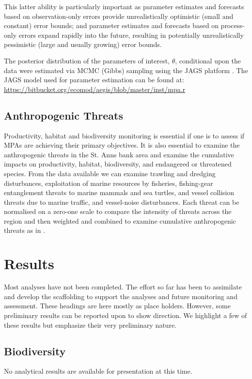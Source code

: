 \documentclass[letterpaper,portrait,11pt]{scrartcl}
\numberwithin{equation}{section}    %
\numberwithin{figure}{section}    %
\numberwithin{table}{section}       %
\begin{document}
This latter ability is particularly important as parameter estimates and forecasts based on observation-only errors provide unrealistically optimistic (small and constant) error bounds; and parameter estimates and forecasts based on process-only errors expand rapidly into the future, resulting in potentially unrealistically pessimistic (large and usually growing) error bounds.

The posterior distribution of the parameters of interest, $\theta$, conditional upon the data were estimated via MCMC (Gibbs) sampling using the JAGS platform \parencite{Plummer03jags}. The JAGS model used for parameter estimation can be found at: \url{https://bitbucket.org/ecomod/aegis/blob/master/inst/mpa.r}

\subsection{Anthropogenic Threats}
Productivity, habitat and biodiversity monitoring is essential if one is to assess if MPAs are achieving their primary objectives. It is also essential to examine the anthropogenic threats in the St. Anns bank area and examine the cumulative impacts on productivity, habitat, biodiversity, and endangered or threatened species. From the data available we can examine trawling and dredging disturbances, exploitation of marine resources by fisheries, fishing-gear entanglement threats to marine mammals and sea turtles, and vessel collision threats due to marine traffic, and vessel-noise disturbances. Each threat can be normalised on a zero-one scale to compare the intensity of threats across the region and then weighted and combined to examine cumulative anthropogenic threats as in \textcite{coll:2012:mediterranean}.



\section{Results}
\label{sec:results}
 
Most analyses have not been completed. The effort so far has been to assimilate and develop the scaffolding to support the analyses and future monitoring and assessment. These headings are here mostly as place holders. However, some preliminary results can be reported upon to show direction. We highlight a few of these results but emphasize their very preliminary nature. 

\subsection{Biodiversity}
No analytical results are available for presentation at this time.
\end{document}
